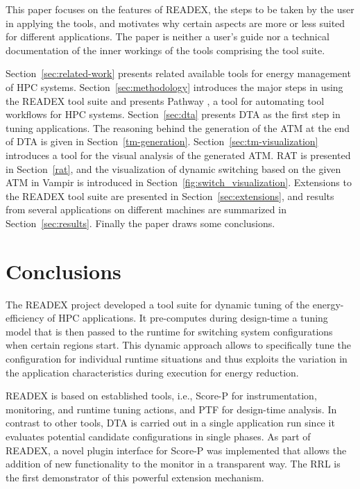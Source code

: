 \documentclass[runningheads]{llncs}
\begin{document}
This paper focuses on the features of READEX, the steps to be taken by the user in applying the tools, and motivates why certain aspects are more or less suited for different applications. The paper is neither a user's guide nor a technical documentation of the inner workings of the tools comprising the tool suite. 

Section~\ref{sec:related-work} presents related available tools for energy management of HPC systems. Section~\ref{sec:methodology} introduces the major steps in using the READEX tool suite and presents Pathway \cite{Pathway:Petkov13}, a tool for automating tool workflows for HPC systems. Section~\ref{sec:dta} presents DTA as the first step in tuning applications. The reasoning behind the generation of the ATM at the end of DTA is given in Section~\ref{tm-generation}. Section~\ref{sec:tm-visualization} introduces a tool for the visual analysis of the generated ATM. RAT is presented in Section~\ref{rat}, and the visualization of dynamic switching based on the given ATM in Vampir is introduced in Section~\ref{fig:switch_visualization}. Extensions to the READEX tool suite are presented in Section~\ref{sec:extensions}, and results from several applications on different machines are summarized in Section~\ref{sec:results}. Finally the paper draws some conclusions. 


















\section{Conclusions} \label{sec:conclusions}

The READEX project developed a tool suite for dynamic tuning of the energy-efficiency of HPC applications. It pre-computes during design-time a tuning model that is then passed to the runtime for switching system configurations when certain regions start. This dynamic approach allows to specifically tune the configuration for individual runtime situations and thus exploits the variation in the application characteristics during execution for energy reduction. 

READEX is based on established tools, i.e., Score-P for instrumentation, monitoring, and runtime tuning actions, and PTF for design-time analysis. In contrast to other tools, DTA is carried out in a single application run since it evaluates potential candidate configurations in single phases. As part of READEX, a novel plugin interface for Score-P was implemented that allows the addition of new functionality to the monitor in a transparent way. The RRL is the first demonstrator of this powerful extension mechanism.
\end{document}
